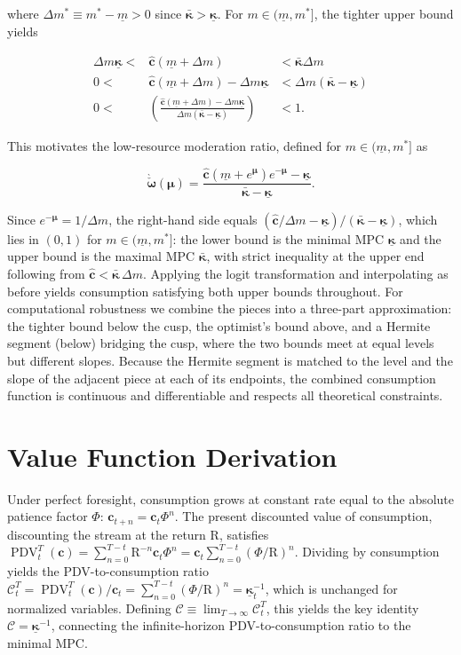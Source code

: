 \documentclass[preprint,authoryear]{elsarticle}
\newcommand{\AbsPatFac}{\Phi}
\newcommand{\Rfree}{\text{R}}
\newcommand{\MPC}{\boldsymbol{\kappa}}
\newcommand{\MPCmin}{\underline{\MPC}}
\newcommand{\MPCmax}{\bar{\MPC}}
\newcommand{\mNrm}{m}
\newcommand{\mNrmEx}{\Delta \mNrm}
\newcommand{\cFunc}{\mathbf{c}}
\newcommand{\cFuncReal}{\hat{\cFunc}}
\newcommand{\mNrmCusp}{\mNrm^*}
\newcommand{\mNrmCuspEx}{\Delta \mNrm^*}
\newcommand{\mNrmMin}{\underline{\mNrm}}
\newcommand{\logmNrmEx}{\boldsymbol{\mu}}
\newcommand{\modRte}{\boldsymbol{\omega}}
\newcommand{\modRteLoTightUpBd}{\grave{\check{\modRte}}}
\newcommand{\cLvl}{\mathbf{c}}
\newcommand{\PDV}{\operatorname{PDV}}
\newcommand{\PDVCoverc}{\mathcal{C}}
\begin{document}
where $\mNrmCuspEx\equiv\mNrmCusp -\mNrmMin > 0$ since $\MPCmax > \MPCmin$. For $\mNrm \in (\mNrmMin, \mNrmCusp]$, the tighter upper bound yields

\begin{equation}
\begin{array}{rcl}
\mNrmEx \MPCmin < & \cFuncReal(\mNrmMin+\mNrmEx) & < \MPCmax \mNrmEx \\
0 < & \cFuncReal(\mNrmMin+\mNrmEx) - \mNrmEx \MPCmin & < \mNrmEx(\MPCmax- \MPCmin) \\
0 < & \left(\frac{\cFuncReal(\mNrmMin+\mNrmEx) - \mNrmEx \MPCmin}{\mNrmEx(\MPCmax- \MPCmin)}\right) & < 1.
\end{array}
\end{equation}

This motivates the low-resource moderation ratio, defined for $\mNrm \in (\mNrmMin,\mNrmCusp]$ as

\begin{equation}
\label{eq:modRteLoTightUpBd}
\modRteLoTightUpBd(\logmNrmEx) = \frac{\cFuncReal(\mNrmMin+e^{\logmNrmEx})e^{-\logmNrmEx}-\MPCmin}{\MPCmax-\MPCmin}.
\end{equation}

Since $e^{ -\logmNrmEx} = 1/\mNrmEx$, the right-hand side equals $(\cFuncReal/\mNrmEx - \MPCmin)/(\MPCmax - \MPCmin)$, which lies in $(0,1)$ for $\mNrm \in (\mNrmMin,\mNrmCusp]$: the lower bound is the minimal MPC $\MPCmin$ and the upper bound is the maximal MPC $\MPCmax$, with strict inequality at the upper end following from $\cFuncReal < \MPCmax\,\mNrmEx$. Applying the logit transformation and interpolating as before yields consumption satisfying both upper bounds throughout. For computational robustness we combine the pieces into a three-part approximation: the tighter bound below the cusp, the optimist's bound above, and a Hermite segment (below) bridging the cusp, where the two bounds meet at equal levels but different slopes. Because the Hermite segment is matched to the level and the slope of the adjacent piece at each of its endpoints, the combined consumption function is continuous and differentiable and respects all theoretical constraints.

\section{Value Function Derivation}

Under perfect foresight, consumption grows at constant rate equal to the absolute patience factor $\AbsPatFac$: $\cLvl_{t+n}=\cLvl_{t}\AbsPatFac^{n}$. The present discounted value of consumption, discounting the stream at the return $\Rfree$, satisfies $\PDV_{t}^{T}(\cLvl)=\sum_{n=0}^{T -t}\Rfree^{ -n}\cLvl_{t}\AbsPatFac^{n}=\cLvl_{t}\sum_{n=0}^{T -t}(\AbsPatFac/\Rfree)^{n}$. Dividing by consumption yields the PDV-to-consumption ratio $\PDVCoverc_{t}^{T}=\PDV_{t}^{T}(\cLvl)/\cLvl_{t}=\sum_{n=0}^{T -t}(\AbsPatFac/\Rfree)^{n}=\MPCmin_{t}^{ -1}$, which is unchanged for normalized variables. Defining $\PDVCoverc \equiv \lim_{T\to\infty} \PDVCoverc_{t}^{T}$, this yields the key identity $\PDVCoverc = \MPCmin^{ -1}$, connecting the infinite-horizon PDV-to-consumption ratio to the minimal MPC.
\end{document}
